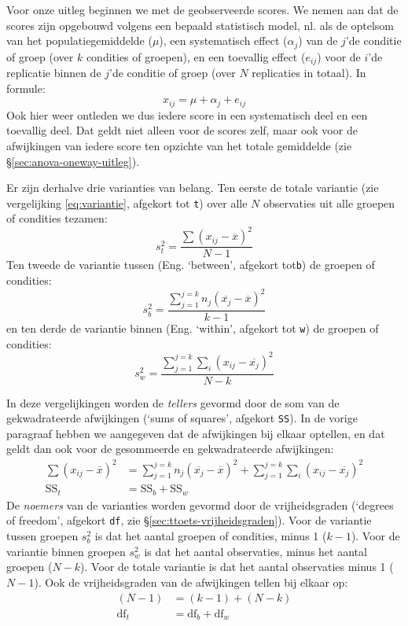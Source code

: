 \documentclass[
]{book}
\begin{document}
Voor onze uitleg beginnen we met de geobserveerde scores. We nemen aan
dat de scores zijn opgebouwd volgens een bepaald statistisch model, nl.
als de optelsom van het populatiegemiddelde (\(\mu\)), een systematisch
effect (\(\alpha_j\)) van de \(j\)'de conditie of groep (over \(k\) condities
of groepen), en een toevallig effect (\(e_{ij}\)) voor de \(i\)'de
replicatie binnen de \(j\)'de conditie of groep (over \(N\) replicaties in
totaal). In formule:
\[x_{ij} = \mu + \alpha_{j} + e_{ij}\]
Ook hier
weer ontleden we dus iedere score in een systematisch deel en een
toevallig deel. Dat geldt niet alleen voor de scores zelf, maar ook voor
de afwijkingen van iedere score ten opzichte van het totale gemiddelde
(zie §\ref{sec:anova-oneway-uitleg}).

Er zijn derhalve drie varianties van belang. Ten eerste de totale
variantie (zie vergelijking
\eqref{eq:variantie}, afgekort tot \texttt{t}) over alle \(N\)
observaties uit alle groepen of condities tezamen:
\begin{equation}
  \label{eq:MStotal}
    s^2_t = \frac{ \sum (x_{ij} - \overline{x})^2 } {N-1}
\end{equation}
Ten tweede de variantie tussen (Eng. `between', afgekort tot\texttt{b}) de
groepen of condities:
\begin{equation}
  \label{eq:MSbetween}
    s^2_b = \frac{ \sum_{j=1}^{j=k} n_j (\overline{x_j} - \overline{x})^2 } {k-1}
\end{equation}
en ten derde de variantie binnen (Eng. `within', afgekort tot \texttt{w}) de
groepen of condities:
\begin{equation}
  \label{eq:MSwithin}
    s^2_w = \frac{ \sum_{j=1}^{j=k} \sum_i (x_{ij} - \overline{x_j})^2 } {N-k}
\end{equation}

In deze vergelijkingen worden de \emph{tellers} gevormd door de som van de
gekwadrateerde afwijkingen (`sums of squares', afgekort \texttt{SS}). In de
vorige paragraaf hebben we aangegeven dat de afwijkingen bij elkaar
optellen, en dat geldt dan ook voor de gesommeerde en gekwadrateerde
afwijkingen:
\begin{align}
  \label{eq:SStotal}
    { \sum (x_{ij} - \overline{x})^2 } &= 
    { \sum_{j=1}^{j=k} n_j (\overline{x_j} - \overline{x})^2 } + 
    { \sum_{j=1}^{j=k} \sum_i (x_{ij} - \overline{x_j})^2 } \\
    \textrm{SS}_t &= \textrm{SS}_b + \textrm{SS}_w
\end{align}
De
\emph{noemers} van de varianties worden gevormd door de vrijheidsgraden
(`degrees of freedom', afgekort \texttt{df}, zie
§\ref{sec:ttoets-vrijheidsgraden}). Voor de variantie tussen
groepen \(s^2_b\) is dat het aantal groepen of condities, minus 1 (\(k-1\)).
Voor de variantie binnen groepen \(s^2_w\) is dat het aantal observaties,
minus het aantal groepen (\(N-k\)). Voor de totale variantie is dat het
aantal observaties minus 1 (\(N-1\)). Ook de vrijheidsgraden van de
afwijkingen tellen bij elkaar op:
\begin{align}
  \label{eq:dftotal1}
    { (N-1) } &= { (k-1) } + { (N-k) } \\
    \textrm{df}_t &= \textrm{df}_b + \textrm{df}_w
\end{align}
\end{document}
